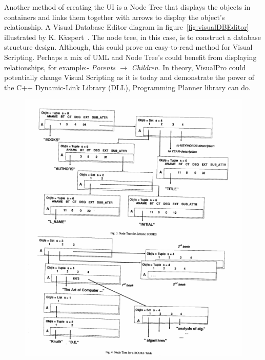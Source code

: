 \documentclass[12pt]{report} %
\begin{document}
		Another method of creating the UI is a Node Tree that displays the objects in containers and links them together with arrows to display the object's relationship. A Visual Database Editor diagram in figure~\ref{fig:visualDBEditor} illustrated by K. K${\ddot{u}}$spert~\cite{kuspert_design_1990}. The node tree, in this case, is to construct a database structure design. Although, this could prove an easy-to-read method for Visual Scripting. Perhaps a mix of UML and Node Tree's could benefit from displaying relationships, for example:- \textit{Parents ${\to}$ Children}. In theory, VisualPro could potentially change Visual Scripting as it is today and demonstrate the power of the C++ Dynamic-Link Library (DLL), Programming Planner library can do.

		\begin{figure}[H]
			{\includegraphics[scale=0.6]{Figures/VPDBEDIT.png}}
		\end{figure}
\end{document}
